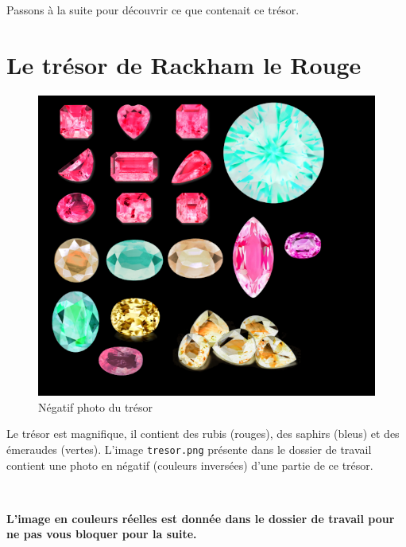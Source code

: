 Passons à la suite pour découvrir ce que contenait ce trésor.

\section{Le trésor de Rackham le Rouge}

\begin{figure}
\vspace{-\baselineskip}
    \includegraphics[width=0.85\linewidth]{tresor}
    \caption{\label{fig05} Négatif photo du trésor}
\end{figure}

Le trésor est magnifique, il contient des rubis (rouges), des saphirs (bleus) et des émeraudes (vertes). L'image \verb?tresor.png? présente dans le dossier de travail contient une photo en négatif (couleurs inversées) d'une partie de ce trésor.

~\

\textbf{L'image en couleurs réelles est donnée dans le dossier de travail pour ne pas vous bloquer pour la suite.	}

~\ \\ ~\ \\ ~\ 


\newpage

